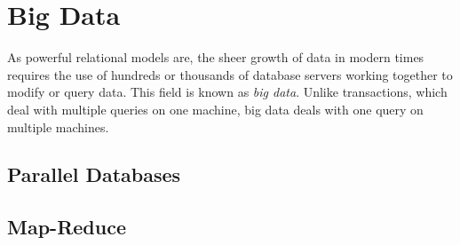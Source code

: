 \section{Big Data} 

As powerful relational models are, the sheer growth of data in modern times requires the use of hundreds or thousands of database servers working together to modify or query data. This field is known as \textit{big data}. Unlike transactions, which deal with multiple queries on one machine, big data deals with one query on multiple machines. 

\subsection{Parallel Databases} 

\subsection{Map-Reduce}

